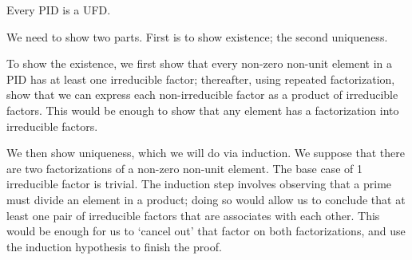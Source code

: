 \begin{theorem}\label{thrm-PID-is-UFD}
    Every PID is a UFD.
\end{theorem}
\begin{proofsketch}
    We need to show two parts. First is to show existence; the second uniqueness.

    To show the existence, we first show that every non-zero non-unit element in a PID has at least one irreducible factor; thereafter, using repeated factorization, show that we can express each non-irreducible factor as a product of irreducible factors. This would be enough to show that any element has a factorization into irreducible factors.

    We then show uniqueness, which we will do via induction. We suppose that there are two factorizations of a non-zero non-unit element. The base case of 1 irreducible factor is trivial. The induction step involves observing that a prime must divide an element in a product; doing so would allow us to conclude that at least one pair of irreducible factors that are associates with each other. This would be enough for us to `cancel out' that factor on both factorizations, and use the induction hypothesis to finish the proof.
\end{proofsketch}
